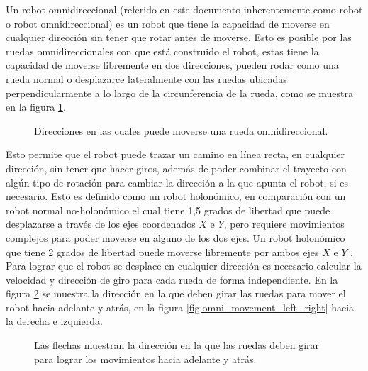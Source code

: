 \documentclass{iccmemoria}
\begin{document}
Un robot omnidireccional (referido en este documento inherentemente como robot o robot omnidireccional) es un robot que tiene la capacidad de moverse en cualquier dirección sin tener que rotar antes de moverse. Esto es posible por las ruedas omnidireccionales con que está construido el robot, estas tiene la capacidad de moverse libremente en dos direcciones, pueden rodar como una rueda normal o desplazarce lateralmente con las ruedas ubicadas perpendicularmente a lo largo de la circunferencia de la rueda, como se muestra en la figura \ref{fig:image_omni_whell}.\\

\begin{figure}[H]
  \centering
  
  \caption[Movimiento rueda omnidireccional.]{Direcciones en las cuales puede moverse una rueda omnidireccional.}
  \label{fig:image_omni_whell}
\end{figure}


Esto permite que el robot puede trazar un camino en línea recta, en cualquier dirección, sin tener que hacer giros, además de poder combinar el trayecto con algún tipo de rotación para cambiar la dirección a la que apunta el robot, si es necesario. Esto es definido como un robot holonómico, en comparación con un robot normal no-holonómico el cual tiene 1,5 grados de libertad que puede desplazarse a través de los ejes coordenados $X$ e $Y$, pero requiere movimientos complejos para poder moverse en alguno de los dos ejes. Un robot holonómico que tiene 2 grados de libertad puede moverse libremente por ambos ejes $X$ e $Y$ \cite{jayakody2015omnirobot}.\\

Para lograr que el robot se desplace en cualquier dirección es necesario calcular la velocidad y dirección de giro para cada rueda de forma independiente. En la figura \ref{fig:omni_movement_up_down} se muestra la dirección en la que deben girar las ruedas para mover el robot hacia adelante y atrás, en la figura \ref{fig:omni_movement_left_right} hacia la derecha e izquierda.

\begin{figure}[H]
  \centering
  \begin{footnotesize}
  
  \end{footnotesize}
  \caption[Movimiento hacia adelante y atrás del robot omnidireccional.]{Las flechas muestran la dirección en la que las ruedas deben girar para lograr los movimientos hacia adelante y atrás.}
  \label{fig:omni_movement_up_down}
\end{figure}
\end{document}
